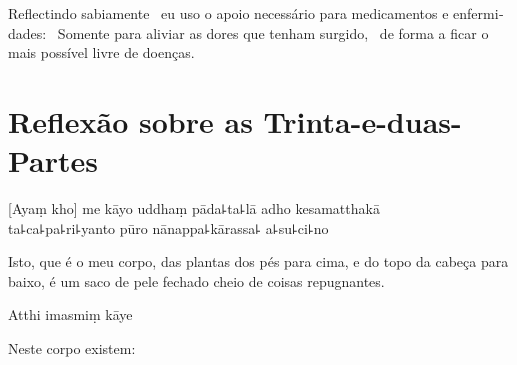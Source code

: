 \begin{english}
  Reflectindo sabiamente \pause\ eu uso o apoio necessário para medicamentos e
  enfermidades: \pause\ Somente para aliviar as dores que tenham surgido,
  \pause\ de forma a ficar o mais possível livre de doenças.
\end{english}

\chapter[Trinta-e-duas-Partes]{Reflexão sobre as Trinta-e-duas-Partes}


\begin{leader}
\end{leader}

[Ayaṃ kho] me kāyo uddhaṃ pāda꜕ta꜕lā adho kesamatthakā\\
ta꜕ca꜕pa꜕ri꜕yanto pūro nānappa꜕kārassa꜕ a꜕su꜕ci꜕no

\begin{english}
  Isto, que é o meu corpo, das plantas dos pés para cima, e do topo da cabeça para baixo, é um saco de pele fechado cheio de coisas repugnantes.
\end{english}

Atthi imasmiṃ kāye

\begin{english}
  Neste corpo existem:
\end{english}

